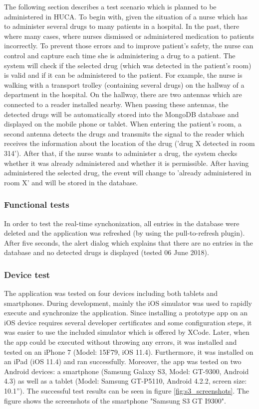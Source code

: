 The following section describes a test scenario which is planned to be administered in HUCA. 
To begin with, given the situation of a nurse which has to administer several drugs to many patients in a hospital. In the past, there where many cases, where nurses dismissed or administered medication to patients incorrectly. To prevent those errors and to improve patient's safety, the nurse can control and capture each time she is administering a drug to a patient. The system will check if the selected drug (which was detected in the patient's room) is valid and if it can be administered to the patient. For example, the nurse is walking with a transport trolley (containing several drugs) on the hallway of a department in the hospital. On the hallway, there are two antennas which are connected to a reader installed nearby. When passing these antennas, the detected drugs will be automatically stored into the MongoDB database and displayed on the mobile phone or tablet. 
When entering the patient's room, a second antenna detects the drugs and transmits the signal to the reader which receives the information about the location of the drug ('drug X detected in room 314'). After that, if the nurse wants to administer a drug, the system checks whether it was already administered and whether it is permissible. After having administered the selected drug, the event will change to 'already administered in room X' and will be stored in the database. 

\subsubsection{Functional tests}

In order to test the real-time synchonization, all entries in the database were deleted and the application was refreshed (by using the pull-to-refresh plugin). After five seconds, the alert dialog which explains that there are no entries in the database and no detected drugs is displayed (tested 06 June 2018). 

\subsubsection{Device test}

The application was tested on four devices including both tablets and smartphones. During development, mainly the iOS simulator was used to rapidly execute and synchronize the application. Since installing a prototype app on an iOS device requires several developer certificates and some configuration steps, it was easier to use the included simulator which is offered by XCode. 
Later, when the app could be executed without throwing any errors, it was installed and tested on an iPhone 7 (Model: 15F79, iOS 11.4). Furthermore, it was installed on an iPad (iOS 11.4) and ran successfully. 
Moreover, the app was tested on two Android devices: a smartphone (Samsung Galaxy S3, Model: GT-9300, Android 4.3) as well as a tablet (Model: Samsung GT-P5110, Android 4.2.2, screen size: 10.1'').
The successful test results can be seen in figure \ref{fig:s3_screenshots}. The figure shows the screenshots of the smartphone "Samsung S3 GT I9300".

